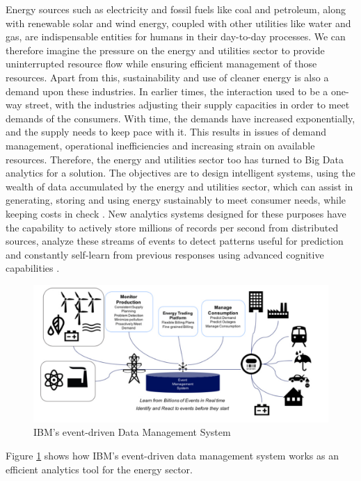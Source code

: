 Energy sources such as electricity and fossil fuels like coal and petroleum, along with renewable solar and wind energy, coupled with other utilities like water and gas, are indispensable entities for humans in their day-to-day processes. We can therefore imagine the pressure on the energy and utilities sector to provide uninterrupted resource flow while ensuring efficient management of those resources. Apart from this, sustainability and use of cleaner energy is also a demand upon these industries. In earlier times, the interaction used to be a one-way street, with the industries adjusting their supply capacities in order to meet demands of the consumers. With time, the demands have increased exponentially, and the supply needs to keep pace with it. This results in issues of demand management, operational inefficiencies and increasing strain on available resources. Therefore, the energy and utilities sector too has turned to Big Data analytics for a solution. The objectives are to design intelligent systems, using the wealth of data accumulated by the energy and utilities sector, which can assist in generating, storing and using energy sustainably to meet consumer needs, while keeping costs in check \cite{downey01}. New analytics systems designed for these purposes have the capability to actively store millions of records per second from  distributed sources, analyze these streams of events to detect patterns useful for prediction and constantly self-learn from previous responses using advanced cognitive capabilities \cite{downey01}.
\begin{figure}
	\includegraphics[width=1.0\columnwidth]{images/IBM_EventStore.pdf}
	\caption{IBM's event-driven Data Management System \cite{downey01}}
	\label{F:event}
\end{figure}
Figure \ref{F:event} shows how IBM's event-driven data management system works as an efficient analytics tool for the energy sector.\\
